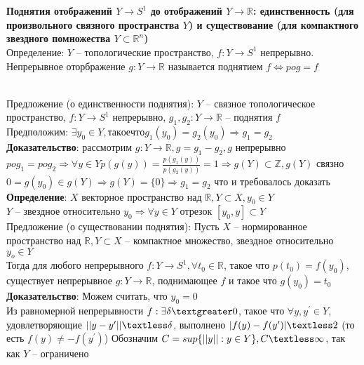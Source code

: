 \section{}
	\textbf{Поднятия отображений $Y \rightarrow S^1$ до отображений $Y \rightarrow \mathbb{R}$: единственность (для произвольного связного пространства $Y$) и существование (для компактного звездного помножества $Y\subset \mathbb{R}^n$)}\\
	
	Определение: $Y$ -- топологические пространство, $f: Y \rightarrow S^1$ непрерывно. Непрерывное оторбражение $g: Y \rightarrow \mathbb{R}$ называется поднятием $f \Leftrightarrow pog = f$\\
	\begin{figure}[h]
	\end{figure}\\
	Предложение (о единственности поднятия): $Y$ -- связное топологическое пространство, $f: Y \rightarrow S^1$ непрерывно, $g_1, g_2: Y \rightarrow \mathbb{R}$ -- поднятия $f$\\
	Предположим: $\exists y_0 \in Y, такое что g_1(y_0) = g_2(y_0) \Rightarrow g_1 = g_2$\\
	\textbf{Доказательство}: рассмотрим $g: Y \rightarrow \mathbb{R}, g = g_1 - g_2, g$ непрерывно\\
	$pog_1 = pog_2 \Rightarrow \forall y \in Y p(g(y)) = \frac{p(g_1 (y))}{p(g_2 (y))} = 1 \Rightarrow g(Y) \subset \mathbb{Z}, g(Y)$ связно\\
	$0 = g(y_0) \in g(Y) \Rightarrow g(Y) = \{0\} \Rightarrow g_1 = g_2$ что и требовалось доказать\\
	\textbf{Определение}: $X$ векторное пространство над $\mathbb{R}, Y\subset X, y_0 \in Y$\\
	$Y$ -- звездное относительно $y_0 \Rightarrow \forall y\in Y$ отрезок $[y_0, y] \subset Y$\\
	Предложение (о существовании поднятия): Пусть $X$ -- нормированное пространство над $\mathbb{R}, Y\subset X$ -- компактное множество, звездное относительно $y_o \in Y$\\
	Тогда для любого непрерывного $f: Y\rightarrow S^1, \forall t_0 \in \mathbb{R}$, такое что $p(t_0) = f(y_0)$, существует непрерывное $g: Y\rightarrow \mathbb{R}$, поднимающее $f$ и такое что $g(y_0) = t_0$\\
	\textbf{Доказательство}: Можем считать, что $y_0 = 0$\\
	Из равномерной непрерывности $f: \exists \delta \textgreater 0$, такое что $\forall y, y^{\prime} \in Y$, удовлетворяющие $||y-y^{\prime}|| \textless \delta$, выполнено $|f(y)-f(y^{\prime})| \textless 2$ (то есть $f(y) \neq -f(y^{\prime})$) Обозначим $C = sup \{||y||: y\in Y\}, C \textless \infty$, так как $Y$ -- ограничено\\
